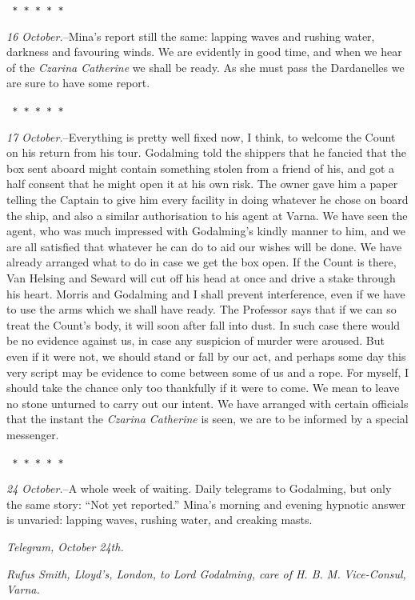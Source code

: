 \documentclass[12pt,openright]{book}
\begin{document}
\texttt{   *       *       *       *       *}

\textit{16 October.}–Mina’s report still the same: lapping waves and rushing water, darkness and favouring winds. We are evidently in good time, and when we hear of the \textit{Czarina Catherine} we shall be ready. As she must pass the Dardanelles we are sure to have some report.

\texttt{   *       *       *       *       *}

\textit{17 October.}–Everything is pretty well fixed now, I think, to welcome the Count on his return from his tour. Godalming told the shippers that he fancied that the box sent aboard might contain something stolen from a friend of his, and got a half consent that he might open it at his own risk. The owner gave him a paper telling the Captain to give him every facility in doing whatever he chose on board the ship, and also a similar authorisation to his agent at Varna. We have seen the agent, who was much impressed with Godalming’s kindly manner to him, and we are all satisfied that whatever he can do to aid our wishes will be done. We have already arranged what to do in case we get the box open. If the Count is there, Van Helsing and Seward will cut off his head at once and drive a stake through his heart. Morris and Godalming and I shall prevent interference, even if we have to use the arms which we shall have ready. The Professor says that if we can so treat the Count’s body, it will soon after fall into dust. In such case there would be no evidence against us, in case any suspicion of murder were aroused. But even if it were not, we should stand or fall by our act, and perhaps some day this very script may be evidence to come between some of us and a rope. For myself, I should take the chance only too thankfully if it were to come. We mean to leave no stone unturned to carry out our intent. We have arranged with certain officials that the instant the \textit{Czarina Catherine} is seen, we are to be informed by a special messenger.

\texttt{   *       *       *       *       *}

\textit{24 October.}–A whole week of waiting. Daily telegrams to Godalming, but only the same story: “Not yet reported.” Mina’s morning and evening hypnotic answer is unvaried: lapping waves, rushing water, and creaking masts.

\textit{Telegram, October 24th.}

\textit{Rufus Smith, Lloyd’s, London, to Lord Godalming, care of H. B. M.}\textit{ }\textit{Vice-Consul, Varna.}
\end{document}
